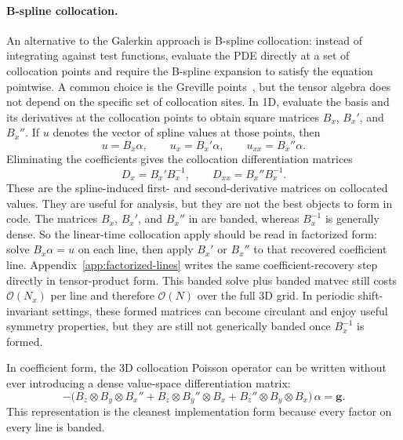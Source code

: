 \documentclass[11pt]{article}
\newcommand{\kron}{\otimes}
\newcommand{\Dx}{D_{x}}
\newcommand{\Dxx}{D_{xx}}
\newcommand{\bigO}{\mathcal{O}}
\newcommand{\Nall}{N}
\begin{document}
\paragraph{B-spline collocation.}
An alternative to the Galerkin approach is B-spline collocation:
instead of integrating against test functions, evaluate the PDE
directly at a set of collocation points and require the B-spline
expansion to satisfy the equation pointwise.  A common choice is the
Greville points~\citep{johnson2005higher}, but the tensor algebra does
not depend on the specific set of collocation sites.  In 1D, evaluate
the basis and its derivatives at the collocation points to obtain
square matrices $B_x$, $B_x'$, and $B_x''$.  If $u$ denotes the vector
of spline values at those points, then
\begin{equation}
  u = B_x \alpha,
  \qquad
  u_x = B_x' \alpha,
  \qquad
  u_{xx} = B_x'' \alpha.
\end{equation}
Eliminating the coefficients gives the collocation differentiation
matrices
\begin{equation}
  \Dx = B_x' B_x^{-1},
  \qquad
  \Dxx = B_x'' B_x^{-1}.
\end{equation}
These are the spline-induced first- and second-derivative matrices on
collocated values.  They are useful for analysis, but they are not the
best objects to form in code.  The matrices $B_x$, $B_x'$, and
$B_x''$ in  are banded, whereas
$B_x^{-1}$ is generally dense.  So the linear-time collocation apply
should be read in factorized form: solve $B_x \alpha = u$ on each
line, then apply $B_x'$ or $B_x''$ to that recovered coefficient line.
Appendix~\ref{app:factorized-lines} writes the same coefficient-recovery
step directly in tensor-product form.
This banded solve plus banded matvec still costs $\bigO(N_x)$ per line
and therefore $\bigO(\Nall)$ over the full 3D grid.
In periodic shift-invariant settings, these formed matrices can become
circulant and enjoy useful symmetry properties, but they are still not
generically banded once $B_x^{-1}$ is formed.

In coefficient form, the 3D collocation Poisson operator can be
written without ever introducing a dense value-space differentiation
matrix:
\begin{equation}
  -\bigl(
    B_z \kron B_y \kron B_x''
    + B_z \kron B_y'' \kron B_x
    + B_z'' \kron B_y \kron B_x
  \bigr)\,\alpha
  = \bm{g}.
\end{equation}
This representation is the cleanest implementation form because every
factor on every line is banded.
\end{document}
